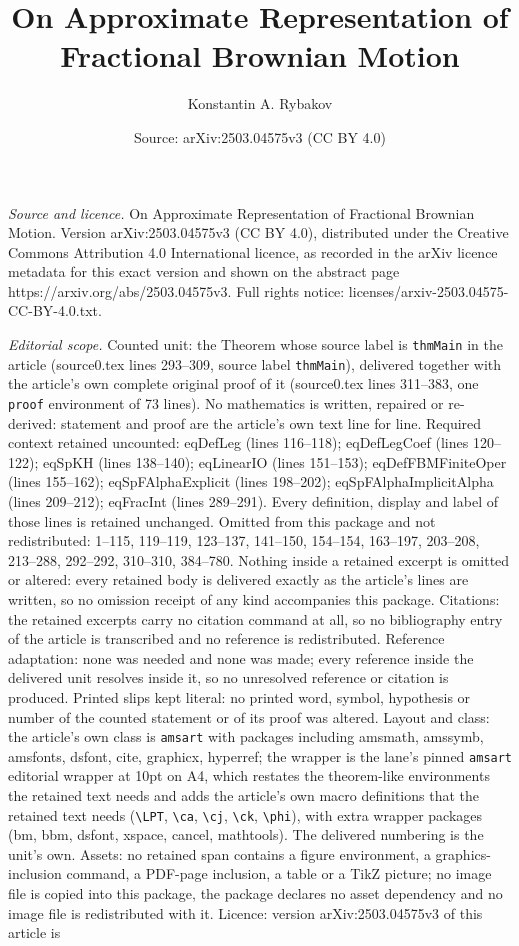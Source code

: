 \documentclass[10pt,a4paper]{amsart}
\title[On Approximate Representation of Fractional Brownian Motion]{On Approximate Representation of Fractional Brownian Motion}
\author{Konstantin A. Rybakov}
\date{Source: arXiv:2503.04575v3 (CC BY 4.0)}
\begin{document}
\maketitle

\noindent\emph{Source and licence.} On Approximate Representation of Fractional Brownian Motion. Version arXiv:2503.04575v3 (CC BY 4.0), distributed under the Creative Commons Attribution 4.0 International licence, as recorded in the arXiv licence metadata for this exact version and shown on the abstract page https://arxiv.org/abs/2503.04575v3. Full rights notice: licenses/arxiv-2503.04575-CC-BY-4.0.txt.\par\smallskip

\noindent\textit{Editorial scope.} Counted unit: the Theorem whose source label is \texttt{thmMain} in the article (source0.tex lines 293--309, source label \texttt{thmMain}), delivered together with the article's own complete original proof of it (source0.tex lines 311--383, one \texttt{proof} environment of 73 lines). No mathematics is written, repaired or re-derived: statement and proof are the article's own text line for line. Required context retained uncounted: eqDefLeg (lines 116--118); eqDefLegCoef (lines 120--122); eqSpKH (lines 138--140); eqLinearIO (lines 151--153); eqDefFBMFiniteOper (lines 155--162); eqSpFAlphaExplicit (lines 198--202); eqSpFAlphaImplicitAlpha (lines 209--212); eqFracInt (lines 289--291). Every definition, display and label of those lines is retained unchanged. Omitted from this package and not redistributed: 1--115, 119--119, 123--137, 141--150, 154--154, 163--197, 203--208, 213--288, 292--292, 310--310, 384--780. Nothing inside a retained excerpt is omitted or altered: every retained body is delivered exactly as the article's lines are written, so no omission receipt of any kind accompanies this package. Citations: the retained excerpts carry no citation command at all, so no bibliography entry of the article is transcribed and no reference is redistributed. Reference adaptation: none was needed and none was made; every reference inside the delivered unit resolves inside it, so no unresolved reference or citation is produced. Printed slips kept literal: no printed word, symbol, hypothesis or number of the counted statement or of its proof was altered. Layout and class: the article's own class is \texttt{amsart} with packages including amsmath, amssymb, amsfonts, dsfont, cite, graphicx, hyperref; the wrapper is the lane's pinned \texttt{amsart} editorial wrapper at 10pt on A4, which restates the theorem-like environments the retained text needs and adds the article's own macro definitions that the retained text needs (\texttt{\textbackslash LPT}, \texttt{\textbackslash ca}, \texttt{\textbackslash cj}, \texttt{\textbackslash ck}, \texttt{\textbackslash phi}), with extra wrapper packages (bm, bbm, dsfont, xspace, cancel, mathtools). The delivered numbering is the unit's own. Assets: no retained span contains a figure environment, a graphics-inclusion command, a PDF-page inclusion, a table or a TikZ picture; no image file is copied into this package, the package declares no asset dependency and no image file is redistributed with it. Licence: version arXiv:2503.04575v3 of this article is 
\end{document}
